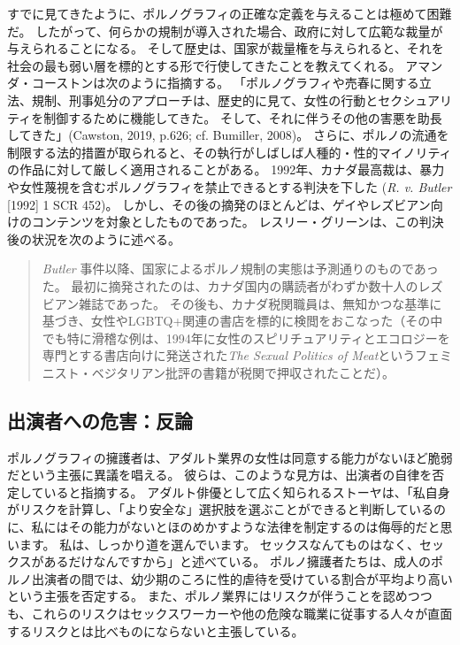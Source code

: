 \documentclass[paper=a4,book,openany]{jlreq}
\newcommand{\ig}[1]{}           %
\begin{document}
すでに見てきたように、ポルノグラフィの正確な定義を与えることは極めて困難だ。
したがって、何らかの規制が導入された場合、政府に対して広範な裁量が与えられることになる。
そして歴史は、国家が裁量権を与えられると、それを社会の最も弱い層を標的とする形で行使してきたことを教えてくれる。
アマンダ・コーストンは次のように指摘する。
「ポルノグラフィや売春に関する立法、規制、刑事処分のアプローチは、歴史的に見て、女性の行動とセクシュアリティを制御するために機能してきた。
そして、それに伴うその他の害悪を助長してきた」(Cawston, 2019, p.626; cf. Bumiller, 2008)。
\nocite{cawston19:_femin_case_pornog}\nocite{bumiller08:_in_abusiv_state}
さらに、ポルノの流通を制限する法的措置が取られると、その執行がしばしば人種的・性的マイノリティの作品に対して厳しく適用されることがある。
1992年、カナダ最高裁は、暴力や女性蔑視を含むポルノグラフィを禁止できるとする判決を下した
(\emph{R. v. Butler} [1992] 1 SCR 452)。
しかし、その後の摘発のほとんどは、ゲイやレズビアン向けのコンテンツを対象としたものであった\citep{mackinnon94:_statem_cathar}。
レスリー・グリーン\ig{Leslie Green}は、この判決後の状況を次のように述べる。

\begin{quote}
\emph{Butler} 事件以降、国家によるポルノ規制の実態は予測通りのものであった。
最初に摘発されたのは、カナダ国内の購読者がわずか数十人のレズビアン雑誌であった。
その後も、カナダ税関職員は、無知かつな基準に基づき、女性やLGBTQ+関連の書店を標的に検閲をおこなった（その中でも特に滑稽な例は、1994年に女性のスピリチュアリティとエコロジーを専門とする書店向けに発送された\emph{The Sexual Politics of Meat}というフェミニスト・ベジタリアン批評の書籍が税関で押収されたことだ）。
\citep{green00:pornographies}
\end{quote}

\subsection{出演者への危害：反論}

ポルノグラフィの擁護者は、アダルト業界の女性は同意する能力がないほど脆弱だという主張に異議を唱える。
彼らは、このような見方は、出演者の自律を否定していると指摘する。
アダルト俳優として広く知られるストーヤは、「私自身がリスクを計算し、「より安全な」選択肢を選ぶことができると判断しているのに、私にはその能力がないとほのめかすような法律を制定するのは侮辱的だと思います。
私は、しっかり道を選んでいます。
セックスなんてものはなく、セックスがあるだけなんですから」と述べている\citep{kernes12:_no_gover_waste_commit_holds_press_confer}。
ポルノ擁護者たちは、成人のポルノ出演者の間では、幼少期のころに性的虐待を受けている割合が平均より高いという主張を否定する\citep[p.621]{griffith13:_pornog_actres}。
また、ポルノ業界にはリスクが伴うことを認めつつも、これらのリスクはセックスワーカーや他の危険な職業に従事する人々が直面するリスクとは比べものにならないと主張している。
\end{document}
